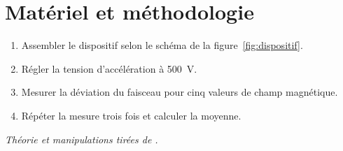 \section{Matériel et méthodologie} \label{sec:methodo}

\begin{enumerate}[leftmargin=*]
    \item Assembler le dispositif selon le schéma de la figure~\ref{fig:dispositif}.
    \item Régler la tension d'accélération à \SI{500}{\volt}.
    \item Mesurer la déviation du faisceau pour cinq valeurs de champ magnétique.
    \item Répéter la mesure trois fois et calculer la moyenne.
\end{enumerate}

\noindent \textit{Théorie et manipulations tirées de \cite{hamelin_physique_nodate}.}
